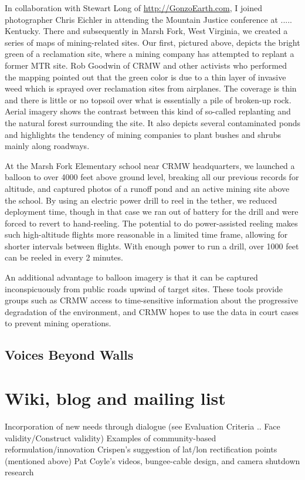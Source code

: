 \documentclass[11pt]{report}
\begin{document}
In collaboration with Stewart Long of \url{http://GonzoEarth.com}, I joined photographer Chris Eichler in attending the Mountain Justice conference at ..... Kentucky. There and subsequently in Marsh Fork, West Virginia, we created a series of maps of mining-related sites. Our first, pictured above, depicts the bright green of a reclamation site, where a mining company has attempted to replant a former MTR site. Rob Goodwin of CRMW and other activists who performed the mapping pointed out that the green color is due to a thin layer of invasive weed which is sprayed over reclamation sites from airplanes. The coverage is thin and there is little or no topsoil over what is essentially a pile of broken-up rock. Aerial imagery shows the contrast between this kind of so-called replanting and the natural forest surrounding the site. It also depicts several contaminated ponds and highlights the tendency of mining companies to plant bushes and shrubs mainly along roadways. 

At the Marsh Fork Elementary school near CRMW headquarters, we launched a balloon to over 4000 feet above ground level, breaking all our previous records for altitude, and captured photos of a runoff pond and an active mining site above the school. By using an electric power drill to reel in the tether, we reduced deployment time, though in that case we ran out of battery for the drill and were forced to revert to hand-reeling. The potential to do power-assisted reeling makes such high-altitude flights more reasonable in a limited time frame, allowing for shorter intervals between flights. With enough power to run a drill, over 1000 feet can be reeled in every 2 minutes. 

An additional advantage to balloon imagery is that it can be captured inconspicuously from public roads upwind of target sites. These tools provide groups such as CRMW access to time-sensitive information about the progressive degradation of the environment, and CRMW hopes to use the data in court cases to prevent mining operations.

\subsection{Voices Beyond Walls}

\section{Wiki, blog and mailing list}
        Incorporation of new needs through dialogue (see Evaluation Criteria .. Face validity/Construct validity)
        Examples of community-based reformulation/innovation
            Crispen's suggestion of lat/lon rectification points (mentioned above)
            Pat Coyle's videos, bungee-cable design, and camera shutdown research
\end{document}
